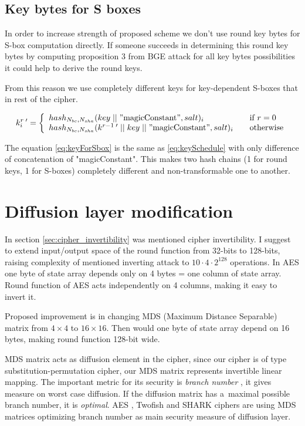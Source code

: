 \documentclass[11pt,oneside,final]{fithesis2}
\begin{document}
    \subsection{Key bytes for S boxes}
    In order to increase strength of proposed scheme we don't use round key bytes for S-box computation directly. If someone succeeds in determining 
    this round key bytes by computing proposition 3 from BGE attack for all key bytes possibilities it could help to derive the round keys.
    
    From this reason we use completely different keys for key-dependent S-boxes that in rest of the cipher.

    \begin{equation}\label{eq:keyForSbox}
    k_i^{r \; \prime} = \left\{ 
    \begin{array}{l l} 
	hash_{N_{bc}, N_{sha}}(key\; || \; "\text{magicConstant}", salt)_i                              & \quad \text{if $r=0$}\\
	hash_{N_{bc}, N_{sha}}(k^{r-1 \; \prime} \; || \; key \; || \; "\text{magicConstant}", salt)_i            & \quad \text{otherwise}
    \end{array} \right.
    \end{equation}
    
    The equation \ref{eq:keyForSbox} is the same as \ref{eq:keySchedule} with only difference of concatenation of "magicConstant". This makes 
    two hash chains (1 for round keys, 1 for S-boxes) completely different and non-transformable one to another.
   
    \section{Diffusion layer modification}\label{sec:cipher_invert_improvement}
    In section \ref{sec:cipher_invertibility} was mentioned cipher invertibility. I suggest to extend input/output space of the round function
    from 32-bits to 128-bits, raising complexity of mentioned inverting attack to $10\cdot4\cdot2^{128}$ operations. In AES one byte of state array depends
    only on 4 bytes = one column of state array. Round function of AES acts independently on 4 columns, making it easy to invert it. 

    Proposed improvement is in changing MDS (Maximum Distance Separable) matrix from $4 \times 4$ to $16 \times 16$. 
    Then would one byte of state array depend on 16 bytes, making round function 128-bit wide.

    MDS matrix acts as diffusion element in the cipher, since our cipher is of type substitution-permutation cipher, our MDS matrix 
    represents invertible linear mapping. The important metric for its security is \emph{branch number} \citep{daemenBranch}, it gives measure on
    worst case diffusion. If the diffusion matrix has a~maximal possible branch number, it is \emph{optimal}. 
    AES \citep{2002-daemen}, Twofish \citep{Schneier98twofish:a} and SHARK \citep{shark96} ciphers are using MDS matrices optimizing branch number as 
    main security measure of diffusion layer.
    
\end{document}

